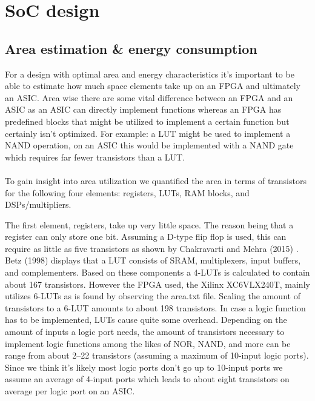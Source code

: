\section{SoC design}
\subsection{Area estimation \& energy consumption}
For a design with optimal area and energy characteristics it's important to be able to estimate how much space elements take up on an FPGA and ultimately an ASIC. 
Area wise there are some vital difference between an FPGA and an ASIC as an ASIC can directly implement functions whereas an FPGA has predefined blocks that might be utilized to implement a certain function but certainly isn't optimized. 
For example: a LUT might be used to implement a NAND operation, on an ASIC this would be implemented with a NAND gate which requires far fewer transistors than a LUT.\\\\
To gain insight into area utilization we quantified the area in terms of transistors for the following four elements: registers, LUTs, RAM blocks, and DSPs/multipliers. 

The first element, registers, take up very little space. 
The reason being that a register can only store one bit. Assuming a D-type flip flop is used, this can require as little as five transistors as shown by Chakravarti and Mehra (2015) \cite{Chakravarti}.
Betz (1998) \cite{betz} displays that a LUT consists of SRAM, multiplexers, input buffers, and complementers. 
Based on these components a 4-LUTs is calculated to contain about \num{167} transistors. However the FPGA used, the Xilinx XC6VLX240T, mainly utilizes 6-LUTs as is found by observing the area.txt file. 
Scaling the amount of transistors to a 6-LUT amounts to about 198 transistors. 
In case a logic function has to be implemented, LUTs cause quite some overhead. 
Depending on the amount of inputs a logic port needs, the amount of transistors necessary to implement logic functions among the likes of NOR, NAND, and more can be range from about \numrange{2}{22} transistors (assuming a maximum of 10-input logic ports). 
Since we think it's likely most logic ports don't go up to 10-input ports we assume an average of 4-input ports which leads to about eight transistors on average per logic port on an ASIC.\\

